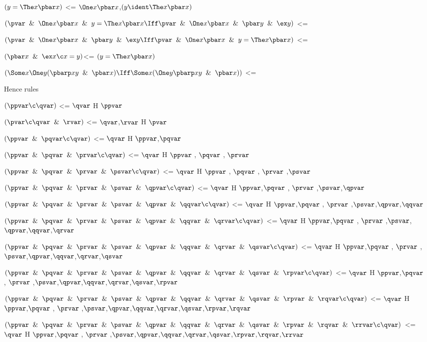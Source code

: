 $(y = \The x \pbar x)$ <=  $\One x\pbar x $,$(y \ident \The x \pbar x)$ 

$(\pvar \And \One x\pbar x \And y = \The x \pbar x\Iff\pvar \And \One x\pbar x\And \pbar y \And \ex y)$ <=

$(\pvar \And  \One x\pbar x\And \pbar y \And \ex y\Iff \pvar \And \One x\pbar x \And y = \The x \pbar x)$ <=

$(\pbar x \And \ex x \c x = y)$<= $(y = \The x \pbar x)$

$(\Some x \One y(\pbarp xy \And \pbar x)\Iff \Some x(\One y\pbarp xy \And \pbar x))$ <=
\lineb


Hence rules
\lineb

$(\ppvar \c \qvar)$ <= $\qvar$ H $\ppvar$

$(\pvar \c \qvar \And \rvar)$ <= $\qvar$,$\rvar$ H $\pvar$

$(\ppvar \And \pqvar\c \qvar)$ <= $\qvar$ H $\ppvar$,$\pqvar$

$(\ppvar \And \pqvar \And \prvar \c \qvar)$ <= $\qvar$ H $\ppvar$ , $\pqvar$ , $\prvar$ 

$(\ppvar \And \pqvar \And \prvar \And \psvar\c \qvar)$ <= $\qvar$ H $\ppvar$ , $\pqvar$ , $\prvar$ ,$\psvar$

$(\ppvar \And \pqvar \And \prvar \And \psvar\And \qpvar\c \qvar)$ <= $\qvar$ H $\ppvar$,$\pqvar$ , $\prvar$ ,$\psvar$,$\qpvar$

$(\ppvar \And \pqvar \And \prvar \And \psvar\And \qpvar \And \qqvar \c \qvar)$ <= $\qvar$ H $\ppvar$,$\pqvar$ , $\prvar$ ,$\psvar$,$\qpvar$,$\qqvar$

$(\ppvar \And \pqvar \And \prvar \And \psvar\And \qpvar \And \qqvar \And \qrvar \c \qvar)$ <= $\qvar$ H $\ppvar$,$\pqvar$ , $\prvar$ ,$\psvar$,$\qpvar$,$\qqvar$,$\qrvar$

$(\ppvar \And \pqvar \And \prvar \And \psvar\And \qpvar \And \qqvar \And \qrvar \And \qsvar\c \qvar)$ <= $\qvar$ H $\ppvar$,$\pqvar$ , $\prvar$ ,$\psvar$,$\qpvar$,$\qqvar$,$\qrvar$,$\qsvar$

$(\ppvar \And \pqvar \And \prvar \And \psvar\And \qpvar \And \qqvar \And \qrvar \And \qsvar \And \rpvar\c \qvar)$ <= $\qvar$ H $\ppvar$,$\pqvar$ , $\prvar$ ,$\psvar$,$\qpvar$,$\qqvar$,$\qrvar$,$\qsvar$,$\rpvar$

$(\ppvar \And \pqvar \And \prvar \And \psvar\And \qpvar \And \qqvar \And \qrvar \And \qsvar \And \rpvar\And\rqvar\c \qvar)$ <= $\qvar$ H $\ppvar$,$\pqvar$ , $\prvar$ ,$\psvar$,$\qpvar$,$\qqvar$,$\qrvar$,$\qsvar$,$\rpvar$,$\rqvar$

$(\ppvar \And \pqvar \And \prvar \And \psvar\And \qpvar \And \qqvar \And \qrvar \And \qsvar \And \rpvar\And \rqvar\And \rrvar\c \qvar)$ <= $\qvar$ H $\ppvar$,$\pqvar$ , $\prvar$ ,$\psvar$,$\qpvar$,$\qqvar$,$\qrvar$,$\qsvar$,$\rpvar$,$\rqvar$,$\rrvar$

